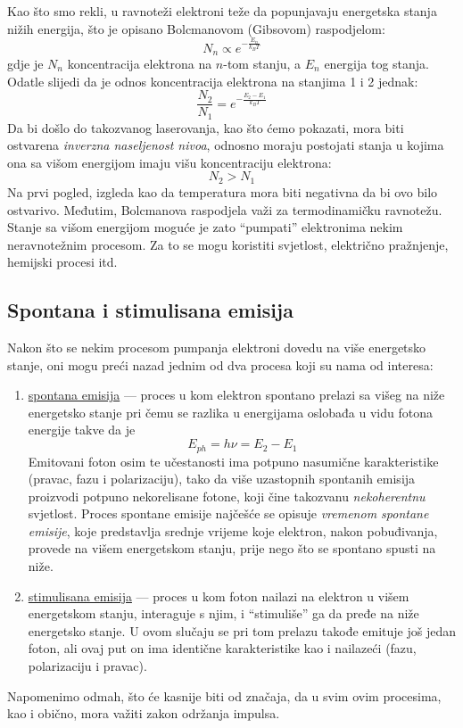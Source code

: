 \documentclass[fleqn]{report}
\begin{document}
Kao što smo rekli, u ravnoteži elektroni teže da popunjavaju energetska stanja nižih energija, što je opisano Bolcmanovom (Gibsovom) raspodjelom:
\begin{equation*}
    N_n \propto e^{-\frac{E_n}{k_B T}}
\end{equation*}
gdje je $N_n$ koncentracija elektrona na $n$-tom stanju, a $E_n$ energija tog stanja.
Odatle slijedi da je odnos koncentracija elektrona na stanjima 1 i 2 jednak:
\begin{equation*}
    \frac{N_2}{N_1} = e^{-\frac{E_2 - E_1}{k_B T}}
\end{equation*}
Da bi došlo do takozvanog laserovanja, kao što ćemo pokazati, mora biti ostvarena \emph{inverzna naseljenost nivoa}, odnosno moraju postojati stanja u kojima ona sa višom energijom imaju višu koncentraciju elektrona:
\begin{equation*}
    N_2 > N_1
\end{equation*}
Na prvi pogled, izgleda kao da temperatura mora biti negativna da bi ovo bilo ostvarivo.
Međutim, Bolcmanova raspodjela važi za termodinamičku ravnotežu.
Stanje sa višom energijom moguće je zato \enquote{pumpati} elektronima nekim neravnotežnim procesom.
Za to se mogu koristiti svjetlost, električno pražnjenje, hemijski procesi itd.

\subsection{Spontana i stimulisana emisija}

Nakon što se nekim procesom pumpanja elektroni dovedu na više energetsko stanje, oni mogu preći nazad jednim od dva procesa koji su nama od interesa:

\begin{enumerate}
    \item \underline{spontana emisija} --- proces u kom elektron spontano prelazi sa višeg na niže energetsko stanje pri čemu se razlika u energijama oslobađa u vidu fotona energije takve da je
          \begin{equation*}
              E_{ph} = h \nu = E_2 - E_1
          \end{equation*}
          Emitovani foton osim te učestanosti ima potpuno nasumične karakteristike (pravac, fazu i polarizaciju), tako da više uzastopnih spontanih emisija proizvodi potpuno nekorelisane fotone, koji čine takozvanu \emph{nekoherentnu} svjetlost.
          Proces spontane emisije najčešće se opisuje \emph{vremenom spontane emisije}, koje predstavlja srednje vrijeme koje elektron, nakon pobuđivanja, provede na višem energetskom stanju, prije nego što se spontano spusti na niže.
    \item \underline{stimulisana emisija} --- proces u kom foton  nailazi na elektron u višem energetskom stanju, interaguje s njim, i \enquote{stimuliše} ga da pređe na niže energetsko stanje.
          U ovom slučaju se pri tom prelazu takođe emituje još jedan foton, ali ovaj put on ima identične karakteristike kao i nailazeći (fazu, polarizaciju i pravac).
\end{enumerate}
Napomenimo odmah, što će kasnije biti od značaja, da u svim ovim procesima, kao i obično, mora važiti zakon održanja impulsa.
\end{document}
